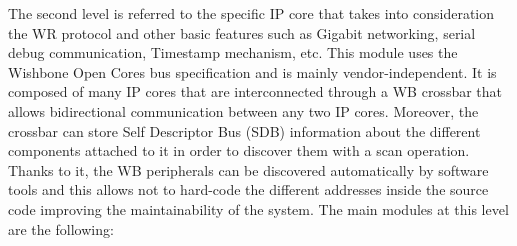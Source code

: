 \documentclass[review]{elsarticle}
\begin{document}

The second level is referred to the specific IP core that takes into consideration the WR protocol and other basic features such as Gigabit networking, serial debug communication, Timestamp mechanism, etc. This module uses the Wishbone Open Cores bus specification and is mainly vendor-independent. It is composed of many IP cores that are interconnected through a WB crossbar that allows bidirectional communication between any two IP cores. Moreover, the crossbar can store Self Descriptor Bus (SDB) information about the different components attached to it in order to discover them with a scan operation. Thanks to it, the WB peripherals can be discovered automatically by software tools and this allows not to hard-code the different addresses inside the source code improving the maintainability of the system. The main modules at this level are the following:

\end{document}
